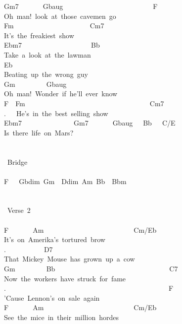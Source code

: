{Gm7\ \ \ \ \ \ \ Gbaug\ \ \ \ \ \ \ \ \ \ \ \ \ \ \ \ \ \ \ \ \ \ \ \ \ \ F\\
Oh\ man!\ look\ at\ those\ cavemen\ go\\
Fm\ \ \ \ \ \ \ \ \ \ \ \ \ \ \ \ \ \ \ \ \ \ Cm7\\
It's\ the\ freakiest\ show\\
Ebm7\ \ \ \ \ \ \ \ \ \ \ \ \ \ \ \ \ \ \ \ Bb\\
Take\ a\ look\ at\ the\ lawman\\
Eb\ \ \ \ \ \ \ \ \ \ \\
Beating\ up\ the\ wrong\ guy\\
Gm\ \ \ \ \ \ \ \ \ Gbaug\\
Oh\ man!\ Wonder\ if\ he'll\ ever\ know\\
F\ \ Fm\ \ \ \ \ \ \ \ \ \ \ \ \ \ \ \ \ \ \ \ \ \ \ \ \ \ \ \ \ \ \ \ \ \ \ \ Cm7\\
.\ \ \ He's\ in\ the\ best\ selling\ show\\
Ebm7\ \ \ \ \ \ \ \ \ \ \ \ \ \ \ Gm7\ \ \ \ \ \ \ Gbaug\ \ \ Bb\ \ \ C/E\\
Is\ there\ life\ on\ Mars?\\
\\
\\
\lbrack\ Bridge\rbrack\\
\\
F\ \ \ Gbdim\ Gm\ \ Ddim\ Am\ Bb\ \ Bbm\\
\\
\\
\lbrack\ Verse\ 2\rbrack\\
\\
F\ \ \ \ \ \ \ Am\ \ \ \ \ \ \ \ \ \ \ \ \ \ \ \ \ \ \ \ \ \ \ \ \ \ Cm/Eb\\
It's\ on\ Amerika's\ tortured\ brow\\
.\ \ \ \ \ \ \ \ \ \ \ D7\\
That\ Mickey\ Mouse\ has\ grown\ up\ a\ cow\\
Gm\ \ \ \ \ \ \ \ \ Bb\ \ \ \ \ \ \ \ \ \ \ \ \ \ \ \ \ \ \ \ \ \ \ \ \ \ \ \ \ \ \ \ \ C7\\
Now\ the\ workers\ have\ struck\ for\ fame\\
.\ \ \ \ \ \ \ \ \ \ \ \ \ \ \ \ \ \ \ \ \ \ \ \ \ \ \ \ \ \ \ \ \ \ \ \ \ \ \ \ \ \ \ \ \ \ \ F\\
'Cause\ Lennon's\ on\ sale\ again\\
F\ \ \ \ \ \ \ Am\ \ \ \ \ \ \ \ \ \ \ \ \ \ \ \ \ \ \ \ \ \ \ \ \ \ Cm/Eb\\
See\ the\ mice\ in\ their\ million\ hordes\\
}

